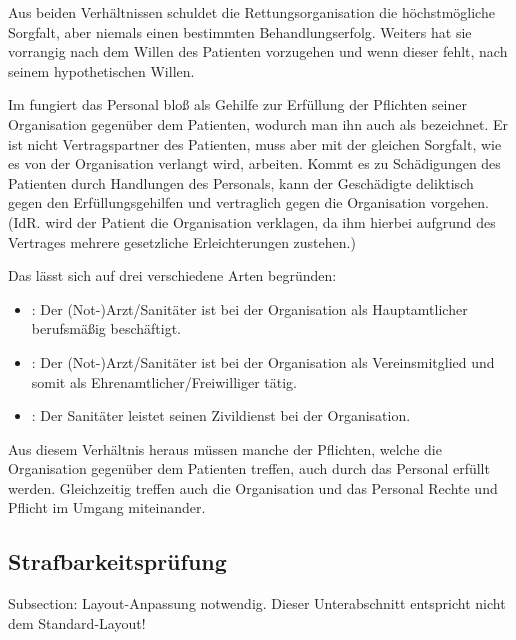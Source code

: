 Aus beiden Verhältnissen schuldet die Rettungsorganisation die
h\"ochstm\"ogliche Sorgfalt, aber niemals einen bestimmten
Behandlungserfolg. Weiters hat sie vorrangig nach dem
Willen des Patienten vorzugehen und wenn dieser fehlt, nach
seinem hypothetischen Willen.

Im  fungiert das Personal
blo{\ss} als Gehilfe zur Erf\"ullung der Pflichten seiner Organisation gegen\"uber
dem Patienten, wodurch man ihn auch als
 bezeichnet. Er ist nicht
Vertragspartner des Patienten, muss aber mit der gleichen Sorgfalt, wie es
von der Organisation verlangt wird, arbeiten. Kommt es zu
Schädigungen des Patienten durch Handlungen des
Personals, kann der Geschädigte deliktisch gegen den
Erf\"ullungsgehilfen und vertraglich gegen die Organisation vorgehen. (IdR. wird der
Patient die Organisation verklagen, da ihm hierbei aufgrund
des Vertrages mehrere gesetzliche Erleichterungen zustehen.)

Das  lässt sich auf drei verschiedene Arten
begr\"unden:

\begin{itemize}
    \item {}: Der (Not-)Arzt/Sanitäter ist bei
    der Organisation als Hauptamtlicher berufsmä{\ss}ig beschäftigt.
    
    \item {}: Der (Not-)Arzt/Sanitäter ist
    bei der Organisation als Vereinsmitglied und somit als
    Ehrenamtlicher/Freiwilliger tätig.
    
    \item {}: Der Sanitäter leistet seinen
    Zivildienst bei der Organisation.
    
\end{itemize}

Aus diesem Verhältnis heraus m\"ussen manche der Pflichten, welche die
Org\-anisation gegen\-\"uber dem Patienten treffen, auch
durch das Personal er\-f\"ullt werden. Gleich\-zeitig
treffen auch die Org\-anisation und das Personal Rechte und
Pflicht im Um\-gang mit\-ein\-ander.

\subsection{Strafbarkeitsprüfung}
\begin{anfxwarning}[author=GABS]{Subsection: Layout-Anpassung notwendig.}
Dieser Unterabschnitt entspricht nicht dem Standard-Layout!
\end{anfxwarning}

